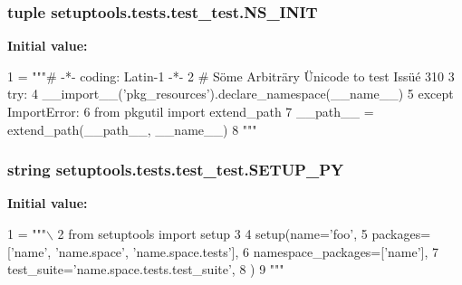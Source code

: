 \subsubsection[{N\+S\+\_\+\+I\+N\+I\+T}]{\setlength{\rightskip}{0pt plus 5cm}tuple setuptools.\+tests.\+test\+\_\+test.\+N\+S\+\_\+\+I\+N\+I\+T}\label{namespacesetuptools_1_1tests_1_1test__test_ad741122b3e5cbf21fa109afd6e9f25a1}
{\bfseries Initial value\+:}
\begin{DoxyCode}
1 = \textcolor{stringliteral}{"""# -*- coding: Latin-1 -*-}
2 \textcolor{stringliteral}{# Söme Arbiträry Ünicode to test Issüé 310}
3 \textcolor{stringliteral}{try:}
4 \textcolor{stringliteral}{    \_\_import\_\_('pkg\_resources').declare\_namespace(\_\_name\_\_)}
5 \textcolor{stringliteral}{except ImportError:}
6 \textcolor{stringliteral}{    from pkgutil import extend\_path}
7 \textcolor{stringliteral}{    \_\_path\_\_ = extend\_path(\_\_path\_\_, \_\_name\_\_)}
8 \textcolor{stringliteral}{"""}
\end{DoxyCode}
\hypertarget{namespacesetuptools_1_1tests_1_1test__test_a734cce3f7b803024a0c11e8fbac796eb}{}
\subsubsection[{S\+E\+T\+U\+P\+\_\+\+P\+Y}]{\setlength{\rightskip}{0pt plus 5cm}string setuptools.\+tests.\+test\+\_\+test.\+S\+E\+T\+U\+P\+\_\+\+P\+Y}\label{namespacesetuptools_1_1tests_1_1test__test_a734cce3f7b803024a0c11e8fbac796eb}
{\bfseries Initial value\+:}
\begin{DoxyCode}
1 = \textcolor{stringliteral}{"""\(\backslash\)}
2 \textcolor{stringliteral}{from setuptools import setup}
3 \textcolor{stringliteral}{}
4 \textcolor{stringliteral}{setup(name='foo',}
5 \textcolor{stringliteral}{    packages=['name', 'name.space', 'name.space.tests'],}
6 \textcolor{stringliteral}{    namespace\_packages=['name'],}
7 \textcolor{stringliteral}{    test\_suite='name.space.tests.test\_suite',}
8 \textcolor{stringliteral}{)}
9 \textcolor{stringliteral}{"""}
\end{DoxyCode}
\hypertarget{namespacesetuptools_1_1tests_1_1test__test_ab3539ee847634899ab0d0909bdd1eccc}{}
